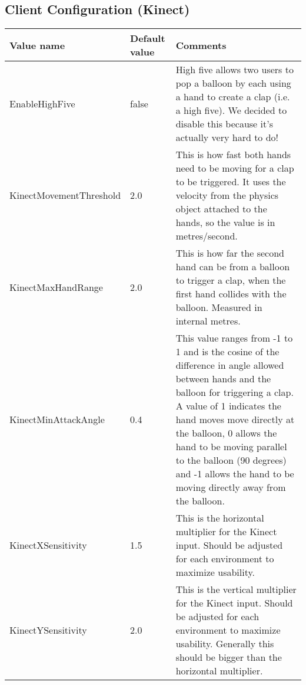 \clearpage{}

\subsection{Client Configuration (Kinect)}

\begin{tabular}{|p{5.0cm}|p{3.0cm}|p{7.6cm}|}

\hline Value name & Default value & Comments \\ \hline

EnableHighFive & false & High five allows two users to pop a balloon by each using a hand to create a clap (i.e. a high five). We decided to disable this because it's actually very hard to do! \\ \hline

KinectMovementThreshold & 2.0 & This is how fast both hands need to be moving for a clap to be triggered. It uses the velocity from the physics object attached to the hands, so the value is in metres/second. \\ \hline

KinectMaxHandRange & 2.0 & This is how far the second hand can be from a balloon to trigger a clap, when the first hand collides with the balloon. Measured in internal metres. \\ \hline

KinectMinAttackAngle & 0.4 & This value ranges from -1 to 1 and is the cosine of the difference in angle allowed between hands and the balloon for triggering a clap. A value of 1 indicates the hand moves move directly at the balloon, 0 allows the hand to be moving parallel to the balloon (90 degrees) and -1 allows the hand to be moving directly away from the balloon. \\ \hline

KinectXSensitivity & 1.5 & This is the horizontal multiplier for the Kinect input. Should be adjusted for each environment to maximize usability. \\ \hline

KinectYSensitivity & 2.0 & This is the vertical multiplier for the Kinect input. Should be adjusted for each environment to maximize usability. Generally this should be bigger than the horizontal multiplier. \\ \hline

\end{tabular}
